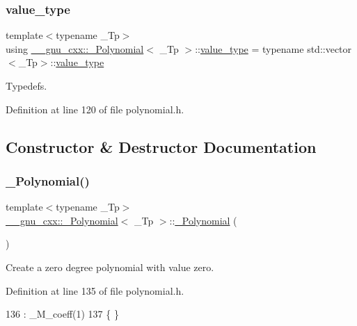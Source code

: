 \subsubsection{\texorpdfstring{value\+\_\+type}{value\_type}}
{\footnotesize\ttfamily template$<$typename \+\_\+\+Tp$>$ \\
using \hyperlink{class____gnu__cxx_1_1__Polynomial}{\+\_\+\+\_\+gnu\+\_\+cxx\+::\+\_\+\+Polynomial}$<$ \+\_\+\+Tp $>$\+::\hyperlink{class____gnu__cxx_1_1__Polynomial_a725563351f50e76084a7a016c06f8a53}{value\+\_\+type} =  typename std\+::vector$<$\+\_\+\+Tp$>$\+::\hyperlink{class____gnu__cxx_1_1__Polynomial_a725563351f50e76084a7a016c06f8a53}{value\+\_\+type}}

Typedefs. 

Definition at line 120 of file polynomial.\+h.



\subsection{Constructor \& Destructor Documentation}
\mbox{\label{class____gnu__cxx_1_1__Polynomial_ad2baf4c12b7e3ab131a592afa3f391ae}} 
\subsubsection{\texorpdfstring{\+\_\+\+Polynomial()}{\_Polynomial()}\hspace{0.1cm}{\footnotesize\ttfamily [1/9]}}
{\footnotesize\ttfamily template$<$typename \+\_\+\+Tp$>$ \\
\hyperlink{class____gnu__cxx_1_1__Polynomial}{\+\_\+\+\_\+gnu\+\_\+cxx\+::\+\_\+\+Polynomial}$<$ \+\_\+\+Tp $>$\+::\hyperlink{class____gnu__cxx_1_1__Polynomial}{\+\_\+\+Polynomial} (\begin{DoxyParamCaption}{ }\end{DoxyParamCaption})\hspace{0.3cm}{\ttfamily [inline]}}

Create a zero degree polynomial with value zero. 

Definition at line 135 of file polynomial.\+h.


\begin{DoxyCode}
136       : \_M\_coeff(1)
137       \{ \}
\end{DoxyCode}
\mbox{\label{class____gnu__cxx_1_1__Polynomial_ac0a657bc804f3db8a03acfd1b98abb39}} 
